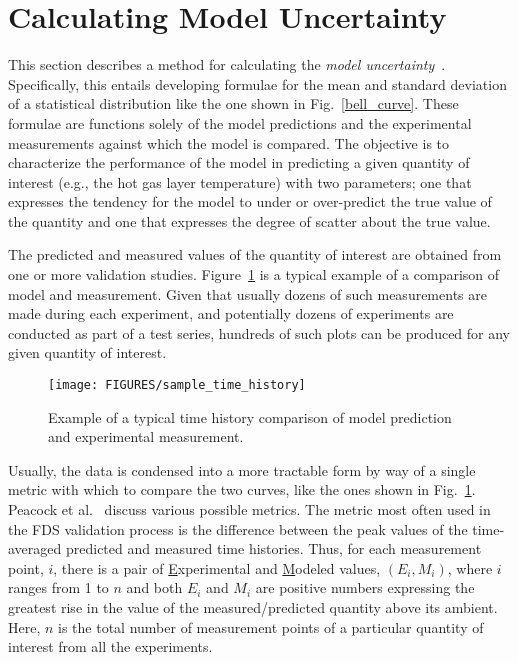 \section{Calculating Model Uncertainty}

This section describes a method for calculating the {\em model uncertainty}~\cite{McGrattan:Metrologia}. Specifically, this entails developing formulae for the mean and standard deviation of a statistical distribution like the one shown in Fig.~\ref{bell_curve}. These formulae are functions solely of the model predictions and the experimental measurements against which the model is compared. The objective is to characterize the performance of the model in predicting a given quantity of interest (e.g., the hot gas layer temperature) with two parameters; one that expresses the tendency for the model to under or over-predict the true value of the quantity and one that expresses the degree of scatter about the true value.

The predicted and measured values of the quantity of interest are obtained from one or more validation studies. Figure~\ref{temp_history} is a typical example of a comparison of model and measurement. Given that usually dozens of such measurements are made during each experiment, and potentially dozens of experiments are conducted as part of a test series, hundreds of such plots can be produced for any given quantity of interest.
\begin{figure}[ht]
\begin{center}
\texttt{[image: FIGURES/sample\_time\_history]}
\end{center}
\caption[Sample time history plots]{Example of a typical time history comparison of model prediction and experimental measurement.}
\label{temp_history}
\end{figure}
Usually, the data is condensed into a more tractable form by way of a single metric with which to compare the two curves, like the ones shown in Fig.~\ref{temp_history}. Peacock et al.~\cite{Peacock:FSJ1999} discuss various possible metrics. The metric most often used in the FDS validation process is the difference between the peak values of the time-averaged predicted and measured time histories. Thus, for each measurement point, $i$, there is a pair of \underline{E}xperimental and \underline{M}odeled values, $(E_i,M_i)$, where $i$ ranges from 1 to $n$ and both $E_i$ and $M_i$ are positive numbers expressing the greatest rise in the value of the measured/predicted quantity above its ambient. Here, $n$ is the total number of measurement points of a particular quantity of interest from all the experiments.

